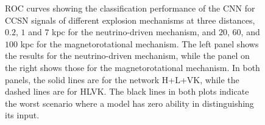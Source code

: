 \documentclass[aps,twocolumn,showpacs,groupedaddress, nofootinbib]{revtex4}  %
\begin{document}
\begin{figure}
     \begin{center}
        \quad
    \end{center}
    \caption{\ac{ROC} curves showing the classification performance of the
\ac{CNN} for \ac{CCSN} signals of different explosion mechanisms at three
distances, $0.2$, $1$ and $7$ kpc for the neutrino-driven mechanism, and $20$, $60$, 
and $100$ kpc for the magnetorotational mechanism. 
The left panel shows the results for the
neutrino-driven mechanism, while the panel on the right shows those for the
magnetorotational mechanism. In both panels, the solid lines are for the
network H+L+VK, while the dashed lines are for HLVK. The black lines in both plots indicate 
the worst scenario where a model has zero ability in distinguishing its input.
\label{fig:ROClog}} 
\end{figure}
\end{document}
